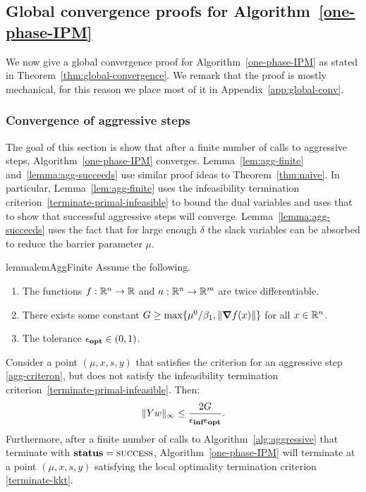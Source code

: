 \documentclass{article}
\begin{document}
\subsection{Global convergence proofs for Algorithm~\ref{one-phase-IPM}}\label{sec:global-conv}


We now give a global convergence proof for Algorithm~\ref{one-phase-IPM} as stated in Theorem~\ref{thm:global-convergence}. We remark that the proof is mostly mechanical, for this reason we place most of it in Appendix~\ref{app:global-conv}. 



\subsubsection{Convergence of aggressive steps}

The goal of this section is show that after a finite number of calls to aggressive steps, Algorithm~\ref{one-phase-IPM} converges. Lemma~\ref{lem:agg-finite} and~\ref{lemma:agg-succeeds} use similar proof ideas to Theorem~\ref{thm:naive}. In particular, Lemma~\ref{lem:agg-finite} uses the infeasibility termination criterion~\eqref{terminate-primal-infeasible} to bound the dual variables and uses that to show that successful aggressive steps will converge. Lemma~\ref{lemma:agg-succeeds} uses the fact that for large enough $\delta$ the slack variables can be absorbed to reduce the barrier parameter $\mu$.


\begin{restatable}{lemma}{lemAggFinite}\label{lem:agg-finite}
Assume the following.
\begin{enumerate}
\item The functions $f : \mathbb{R}^{n} \rightarrow \mathbb{R}$ and $a : \mathbb{R}^{n} \rightarrow \mathbb{R}^{m}$ are twice differentiable. 
\item There exists some constant $G \ge \max\{ \mu^{0} / \beta_{1}, \| \grad f(x) \|  \}$ for all $x \in \mathbb{R}^{n}$. 
\item The tolerance $\epsilon_{\textbf{opt}} \in (0,1)$.
\end{enumerate}
Consider a point $(\mu, x, s, y)$ that satisfies the criterion for an aggressive step \eqref{agg-criteron}, but does not satisfy the infeasibility termination criterion~\eqref{terminate-primal-infeasible}. Then:
$$
\| Y w \|_{\infty} \le \frac{2 G}{\epsilon_{\textbf{inf}} \epsilon_{\textbf{opt}}}.
$$
Furthermore, after a finite number of calls to Algorithm~\ref{alg:aggressive} that terminate with $\textbf{status} = \textsc{success}$, Algorithm~\ref{one-phase-IPM} will terminate at a point $(\mu, x, s, y)$ satisfying the local optimality termination criterion \eqref{terminate-kkt}. 
\end{restatable}
\end{document}
